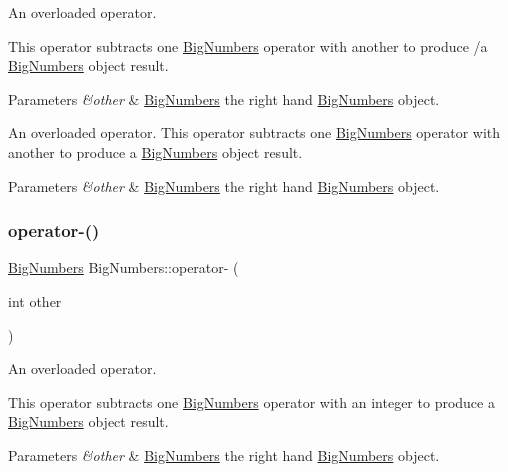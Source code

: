 An overloaded operator. 

This operator subtracts one \mbox{\hyperlink{class_big_numbers}{Big\+Numbers}} operator with another to produce /a \mbox{\hyperlink{class_big_numbers}{Big\+Numbers}} object result. 
\begin{DoxyParams}{Parameters}
{\em \&other} & \mbox{\hyperlink{class_big_numbers}{Big\+Numbers}} the right hand \mbox{\hyperlink{class_big_numbers}{Big\+Numbers}} object.\\
\hline
\end{DoxyParams}
An overloaded operator. This operator subtracts one \mbox{\hyperlink{class_big_numbers}{Big\+Numbers}} operator with another to produce a \mbox{\hyperlink{class_big_numbers}{Big\+Numbers}} object result. 
\begin{DoxyParams}{Parameters}
{\em \&other} & \mbox{\hyperlink{class_big_numbers}{Big\+Numbers}} the right hand \mbox{\hyperlink{class_big_numbers}{Big\+Numbers}} object. \\
\hline
\end{DoxyParams}
\mbox{\label{class_big_numbers_a1905c23eddbec66217222f7d16bde5fd}} 
\subsubsection{\texorpdfstring{operator-\/()}{operator-()}\hspace{0.1cm}{\footnotesize\ttfamily [2/2]}}
{\footnotesize\ttfamily \mbox{\hyperlink{class_big_numbers}{Big\+Numbers}} Big\+Numbers\+::operator-\/ (\begin{DoxyParamCaption}\item[{int}]{other }\end{DoxyParamCaption})}



An overloaded operator. 

This operator subtracts one \mbox{\hyperlink{class_big_numbers}{Big\+Numbers}} operator with an integer to produce a \mbox{\hyperlink{class_big_numbers}{Big\+Numbers}} object result. 
\begin{DoxyParams}{Parameters}
{\em \&other} & \mbox{\hyperlink{class_big_numbers}{Big\+Numbers}} the right hand \mbox{\hyperlink{class_big_numbers}{Big\+Numbers}} object. \\
\hline
\end{DoxyParams}
\mbox{\label{class_big_numbers_a22cd35000290cb5181af536639e7e588}} 
